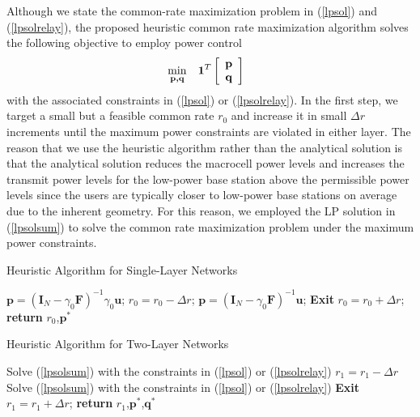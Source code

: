 \documentclass[conference,letterpaper,final,10pt]{IEEEtran}
\begin{document}
Although we state the common-rate maximization problem in (\ref{lpsol}) and (\ref{lpsolrelay}), the proposed heuristic common rate maximization algorithm solves the following objective to employ power control
\begin{align}\label{lpsolsum}
\hspace{-.1in}     \begin{array}{rl}
     \min\limits_{\textbf{p,q}}  &  \textbf{1}^T\left[\begin{array}{c}\textbf{p}\\ \textbf{q}\end{array}\right] \end{array}
\end{align}
with the associated constraints in (\ref{lpsol}) or (\ref{lpsolrelay}). In the first step, we target a small but a feasible common rate $r_0$ and increase it in small $\Delta r$ increments until the maximum power constraints are violated in either layer. The reason that we use the heuristic algorithm rather than the analytical solution is that the analytical solution reduces the macrocell power levels and increases the transmit power levels for the low-power base station above the permissible power levels since the users are typically closer to low-power base stations on average due to the inherent geometry. For this reason, we employed the LP solution in (\ref{lpsolsum}) to solve the common rate maximization problem under the maximum power constraints. \begin{algorithm}
  \caption{Heuristic Algorithm for Single-Layer Networks}\label{singlelayerlpalgorithm}
  \begin{algorithmic}[1]
        \State $\textbf{p} = (\textbf{I}_{N} - \gamma_0 \textbf{F})^{-1} \gamma_0 \textbf{u}$;
             \State $r_0 = r_0 - \Delta r$; $\textbf{p} = (\textbf{I}_{N} - \gamma_0 \textbf{F})^{-1} \textbf{u}$; \textbf{Exit}
        \Else
            \State $r_0 = r_0 + \Delta r$;
        \EndIf
      \EndWhile\label{euclidendwhile}
      \State \textbf{return} $r_0$,$\textbf{p}^*$
  \end{algorithmic}
\end{algorithm}
\begin{algorithm}
  \caption{Heuristic Algorithm for Two-Layer Networks}\label{twolayerlpalgorithm}
  \begin{algorithmic}[1]
        \State Solve (\ref{lpsolsum}) with the constraints in (\ref{lpsol}) or (\ref{lpsolrelay})
             \State $r_1 = r_1 - \Delta r$
             \State Solve (\ref{lpsolsum}) with the constraints in (\ref{lpsol}) or (\ref{lpsolrelay})
             \State \textbf{Exit}
        \Else
            \State $r_1 = r_1 + \Delta r$;
        \EndIf
      \EndWhile\label{euclidendwhile}
      \State \textbf{return} $r_1$,$\textbf{p}^*$,$\textbf{q}^*$
  \end{algorithmic}
\end{algorithm}
\end{document}
